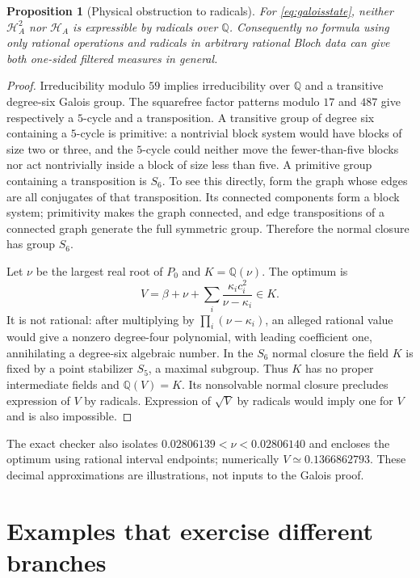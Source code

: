 \documentclass[11pt]{article}
\newtheorem{proposition}[theorem]{Proposition}
\theoremstyle{remark}\newtheorem{remark}[theorem]{Remark}
\newcommand{\HF}{\mathcal H}
\begin{document}
\begin{proposition}[Physical obstruction to radicals]\label{prop:galois}
For \eqref{eq:galoisstate}, neither $\HF_A^2$ nor $\HF_A$ is expressible
by radicals over $\mathbb Q$. Consequently no formula using only rational
operations and radicals in arbitrary rational Bloch data can give both
one-sided filtered measures in general.
\end{proposition}
\begin{proof}
Irreducibility modulo $59$ implies irreducibility over $\mathbb Q$ and a
transitive degree-six Galois group. The squarefree factor patterns modulo
$17$ and $487$ give respectively a $5$-cycle and a transposition.
A transitive group of degree six containing a $5$-cycle is primitive:
a nontrivial block system would have blocks of size two or three, and the
$5$-cycle could neither move the fewer-than-five blocks nor act
nontrivially inside a block of size less than five. A primitive group
containing a transposition is $S_6$. To see this directly, form the graph
whose edges are all conjugates of that transposition. Its connected
components form a block system; primitivity makes the graph connected,
and edge transpositions of a connected graph generate the full symmetric
group. Therefore the normal closure has group $S_6$.

Let $\nu$ be the largest real root of $P_0$ and $K=\mathbb Q(\nu)$.
The optimum is
\[
 V=\beta+\nu+\sum_i\frac{\kappa_ic_i^2}{\nu-\kappa_i}\in K.
\]
It is not rational: after multiplying by
$\prod_i(\nu-\kappa_i)$, an alleged rational value would give a nonzero
degree-four polynomial, with leading coefficient one, annihilating a
degree-six algebraic number. In the $S_6$ normal closure the field $K$ is
fixed by a point stabilizer $S_5$, a maximal subgroup. Thus $K$ has no proper
intermediate fields and $\mathbb Q(V)=K$. Its nonsolvable normal closure
precludes expression of $V$ by radicals. Expression of $\sqrt V$ by
radicals would imply one for $V$ and is also impossible.
\end{proof}

The exact checker also isolates
$0.02806139<\nu<0.02806140$ and encloses the optimum using rational
interval endpoints; numerically $V\simeq0.1366862793$. These decimal
approximations are illustrations, not inputs to the Galois proof.

\section{Examples that exercise different branches}\label{sec:examples}
\end{document}
